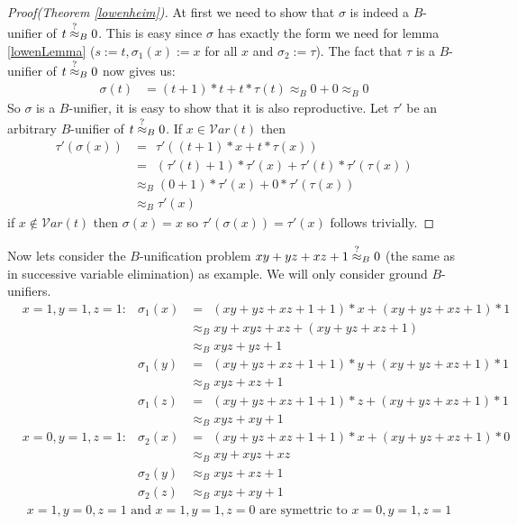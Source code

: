 		\begin{proof}[Proof(Theorem \ref{lowenheim})]
		At first we need to show that $\sigma$ is indeed a $B$-unifier of $t\stackrel{?}{\approx}_B0$. This is easy since $\sigma$ has exactly the form we need for lemma \ref{lowenLemma} ($s:=t,\sigma_1(x):=x$ for all $x$ and $\sigma_2:=\tau$). The fact that $\tau$ is a $B$-unifier of $t\stackrel{?}{\approx}_B0$ now gives us:
		\begin{align*}
		\sigma(t)&=(t+1)*t+t*\tau(t)
		\approx_B0+0
		\approx_B0
		\end{align*}
		So $\sigma$ is a $B$-unifier, it is easy to show that it is also reproductive. Let $\tau'$ be an arbitrary $B$-unifier of $t\stackrel{?}{\approx}_B0$. If $x\in\mathcal{V}ar(t)$ then
		\begin{align*}
		\tau'(\sigma(x))&=\ \ \tau'((t+1)*x+t*\tau(x))\\
		&=\ \ (\tau'(t)+1)*\tau'(x)+\tau'(t)*\tau'(\tau(x))\\
		&\approx_B(0+1)*\tau'(x)+0*\tau'(\tau(x))\\
		&\approx_B\tau'(x)
		\end{align*}
		if $x\notin\mathcal{V}ar(t)$ then $\sigma(x)=x$ so $\tau'(\sigma(x))=\tau'(x)$ follows trivially.
		\end{proof}
		Now lets consider the $B$-unification problem $xy+yz+xz+1\stackrel{?}{\approx}_B0$ (the same as in successive variable elimination) as example. We will only consider ground $B$-unifiers.
		\begin{align*}
		& x=1,y=1,z=1:& \sigma_1(x)&=\ \ (xy+yz+xz+1+1)*x+(xy+yz+xz+1)*1\\
		&&&\approx_Bxy+xyz+xz+(xy+yz+xz+1)\\
		&&&\approx_Bxyz+yz+1\\
		&&\sigma_1(y)&=\ \ (xy+yz+xz+1+1)*y+(xy+yz+xz+1)*1\\
		&&&\approx_Bxyz+xz+1\\
		&&\sigma_1(z)&=\ \ (xy+yz+xz+1+1)*z+(xy+yz+xz+1)*1\\
		&&&\approx_Bxyz+xy+1\\
		& x=0,y=1,z=1:& \sigma_2(x)&=\ \ (xy+yz+xz+1+1)*x+(xy+yz+xz+1)*0\\
		&&&\approx_Bxy+xyz+xz\\
		&&\sigma_2(y)&\approx_Bxyz+xz+1\\
		&&\sigma_2(z)&\approx_Bxyz+xy+1
		\end{align*}
		\begin{align*}
		& x=1,y=0,z=1\text{ and }x=1,y=1,z=0\text{ are symettric to }x=0,y=1,z=1
		\end{align*} 
